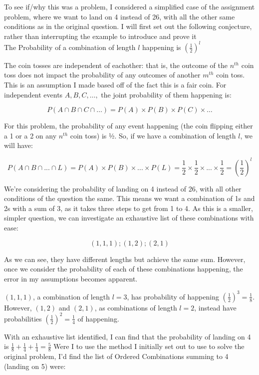 \documentclass[11pt]{article}
\newcommand{\keywordfont}{\textsc}
\newcommand{\keyword}[1]{%
  \marginpar{\raggedright\small\keywordfont{#1}}}
\begin{document}
To see if/why this was a problem, I \keyword{But Why} considered a simplified case of the assignment problem, where we want to land on 4 instead of 26, with all the other same conditions as in the original question. I will first set out the following conjecture, rather than interrupting the example to introduce and prove it\\

The Probability of a combination of length $l$ \keyword{Conjecture 2}  happening is $\left( \frac{1}{2} \right) ^l$

The coin tosses are \keyword{Proof} independent of eachother: that is, the outcome of the $n^{th}$ coin toss does not impact the probability of any outcomes of another $m^{th}$ coin toss. This is an assumption I made based off of the fact this is a fair coin.
For independent events $A, B, C, …,$ the joint probability of them happening is:

$$P(A \cap B \cap C \cap …) = P(A) \times P(B) \times P(C) \times …$$

For this problem, the probability of any event happening (the coin flipping either a 1 or a 2 on any $n^{th}$ coin toss) is ½. So, if we have a combination of length $l$, we will have:

$$ P ( A \cap B \cap ... \cap L ) = P(A) \times P(B) \times  ... \times P(L) = \frac{1}{2} \times \frac{1}{2} \times ... \times \frac{1}{2} =  \left( \frac{1}{2} \right) ^l$$




We’re considering the probability of landing \keyword{Introduce} on 4 instead of 26, with all other conditions of the question the same. This means we want a combination of 1s and 2s with a sum of 3, as it takes three steps to get from 1 to 4. As this is a smaller, simpler question, we can investigate an exhaustive list of these combinations with ease:

$$(1, 1, 1) ; (1 , 2) ; (2, 1)$$

As we can see, they have different lengths but achieve the same sum. However, once we consider the probability of each of these combinations happening, the error in my assumptions becomes apparent.

$(1, 1, 1)$, a combination of length $l=3$, has probability of happening $\left( \frac{1}{2} \right) ^3 = \frac{1}{8}$. However, $(1, 2)$ and $(2, 1)$, as combinations of length $l=2$, instead have probabilities $\left( \frac{1}{2} \right)^2 = \frac{1}{4}$ of happening.

With an exhaustive list identified, I can find that the probability of landing on 4 is $\frac{1}{8} + \frac{1}{4} + \frac{1}{4} = \frac{5}{8}$
Were I to use the method I initially set out to use to solve the original problem, I’d find the list of Ordered Combinations summing to 4 (landing on 5) were:
\end{document}
